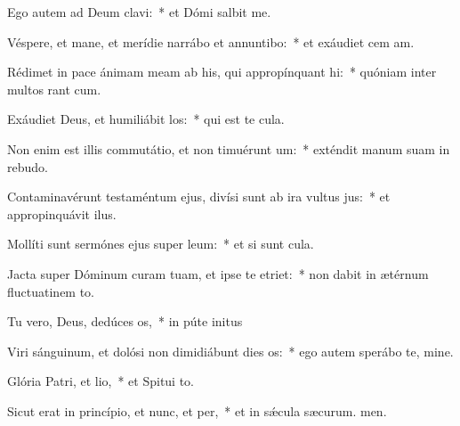 \item Ego autem ad Deum clavi:~* et Dómi salbit me.
\item Véspere, et mane, et merídie narrábo et annuntibo:~* et exáudiet cem am.
\item Rédimet in pace ánimam meam ab his, qui appropínquant hi:~* quóniam inter multos rant cum.
\item Exáudiet Deus, et humiliábit los:~* qui est te cula.
\item Non enim est illis commutátio, et non timuérunt um:~* exténdit manum suam in rebudo.
\item Contaminavérunt testaméntum ejus, divísi sunt ab ira vultus jus:~* et appropinquávit  ilus.
\item Mollíti sunt sermónes ejus super leum:~* et si sunt cula.
\item Jacta super Dóminum curam tuam, et ipse te etriet:~* non dabit in ætérnum fluctuatinem to.
\item Tu vero, Deus, dedúces os,~* in púte initus
\item Viri sánguinum, et dolósi non dimidiábunt dies os:~* ego autem sperábo  te, mine.
\item Glória Patri, et lio,~* et Spitui to.
\item Sicut erat in princípio, et nunc, et per,~* et in sǽcula sæcurum. men.
